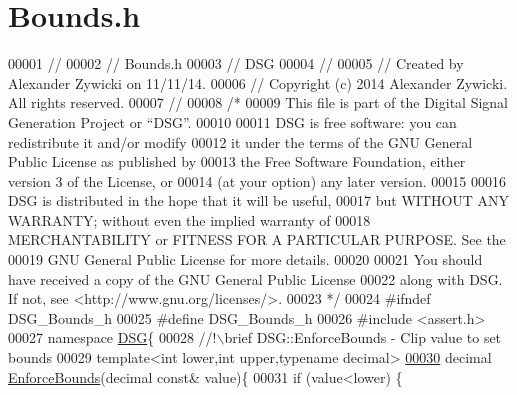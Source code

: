 \hypertarget{_bounds_8h_source}{\section{Bounds.\+h}
\label{_bounds_8h_source}
}

\begin{DoxyCode}
00001 \textcolor{comment}{//}
00002 \textcolor{comment}{//  Bounds.h}
00003 \textcolor{comment}{//  DSG}
00004 \textcolor{comment}{//}
00005 \textcolor{comment}{//  Created by Alexander Zywicki on 11/11/14.}
00006 \textcolor{comment}{//  Copyright (c) 2014 Alexander Zywicki. All rights reserved.}
00007 \textcolor{comment}{//}
00008 \textcolor{comment}{/*}
00009 \textcolor{comment}{ This file is part of the Digital Signal Generation Project or “DSG”.}
00010 \textcolor{comment}{}
00011 \textcolor{comment}{ DSG is free software: you can redistribute it and/or modify}
00012 \textcolor{comment}{ it under the terms of the GNU General Public License as published by}
00013 \textcolor{comment}{ the Free Software Foundation, either version 3 of the License, or}
00014 \textcolor{comment}{ (at your option) any later version.}
00015 \textcolor{comment}{}
00016 \textcolor{comment}{ DSG is distributed in the hope that it will be useful,}
00017 \textcolor{comment}{ but WITHOUT ANY WARRANTY; without even the implied warranty of}
00018 \textcolor{comment}{ MERCHANTABILITY or FITNESS FOR A PARTICULAR PURPOSE.  See the}
00019 \textcolor{comment}{ GNU General Public License for more details.}
00020 \textcolor{comment}{}
00021 \textcolor{comment}{ You should have received a copy of the GNU General Public License}
00022 \textcolor{comment}{ along with DSG.  If not, see <http://www.gnu.org/licenses/>.}
00023 \textcolor{comment}{ */}
00024 \textcolor{preprocessor}{#ifndef DSG\_Bounds\_h}
00025 \textcolor{preprocessor}{#define DSG\_Bounds\_h}
00026 \textcolor{preprocessor}{#include <assert.h>}
00027 \textcolor{keyword}{namespace }\hyperlink{namespace_d_s_g}{DSG}\{\textcolor{comment}{}
00028 \textcolor{comment}{    //!\(\backslash\)brief DSG::EnforceBounds - Clip value to set bounds}
00029 \textcolor{comment}{}    \textcolor{keyword}{template}<\textcolor{keywordtype}{int} lower,\textcolor{keywordtype}{int} upper,\textcolor{keyword}{typename} decimal>
\hypertarget{_bounds_8h_source_l00030}{}\hyperlink{namespace_d_s_g_a8bc6af8f213f4f713bd634ec8545491c}{00030}     decimal \hyperlink{namespace_d_s_g_a8bc6af8f213f4f713bd634ec8545491c}{EnforceBounds}(decimal \textcolor{keyword}{const}& value)\{
00031         \textcolor{keywordflow}{if} (value<lower) \{

\end{DoxyCode}
